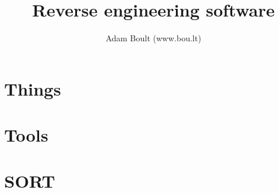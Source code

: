 \documentclass[oneside]{book}
\begin{document}
\author{Adam Boult (www.bou.lt)}
\title{Reverse engineering software}
\maketitle

\setcounter{tocdepth}{0}
\tableofcontents



\part{Things}


\part{Tools}


\part{SORT}

\end{document}
